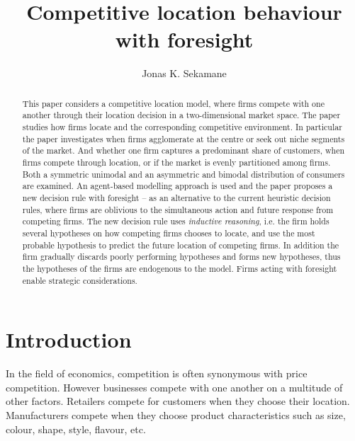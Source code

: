 \documentclass[preprint, 12pt]{elsarticle}
\begin{document}

\begin{frontmatter}

\title{Competitive location behaviour with foresight}
\author{Jonas K. Sekamane}

\begin{abstract}
	This paper considers a competitive location model, where firms compete with one another through their location decision in a two-dimensional market space. The paper studies how firms locate and the  corresponding competitive environment. In particular the paper investigates when firms agglomerate at the centre or seek out niche segments of the market. And whether one firm captures a predominant share of customers, when firms compete through location, or if the market is evenly partitioned among firms. Both a symmetric unimodal and an asymmetric and bimodal distribution of consumers are examined. An agent-based modelling approach is used and the paper proposes a new decision rule with foresight -- as an alternative to the current heuristic decision rules, where firms are oblivious to the simultaneous action and future response from competing firms. The new decision rule uses \emph{inductive reasoning}, i.e. the firm holds several hypotheses on how competing firms chooses to locate, and use the most probable hypothesis to predict the future location of competing firms. In addition the firm gradually discards poorly performing hypotheses and forms new hypotheses, thus the hypotheses of the firms are endogenous to the model. Firms acting with foresight enable strategic considerations.
\end{abstract}

\end{frontmatter}

\newpage
\small
\singlespacing
\makeatletter
\makeatother
\onehalfspacing

\newpage
\clearpage
\normalsize
\onehalfspacing
{}

\section{Introduction}

In the field of economics, competition is often synonymous with price competition. However businesses compete with one another on a multitude of other factors. Retailers compete for customers when they choose their location. Manufacturers compete when they choose product characteristics such as size, colour, shape, style, flavour, etc. 
\end{document}
